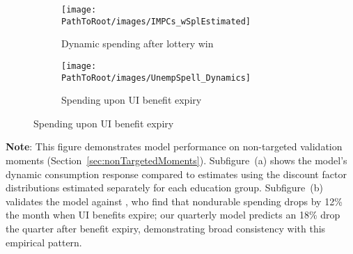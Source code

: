 \documentclass[\PathToRoot/\ProjectName]{subfiles}
\begin{document}
\begin{figure}[H]
  \centering
  \caption{Model validation for non-targeted spending patterns}
  \whenintegrated{\label{fig:untargetedMoments}} 
  \noindent\begin{minipage}{\textwidth}
    \centering
    \begin{subfigure}[b]{.48\linewidth}
      \centering
      \texttt{[image: \\PathToRoot/images/IMPCs\_wSplEstimated]}
      \caption{Dynamic spending after lottery win}
      \whenintegrated{\label{fig:USaggmpclotterywin}} 
    \end{subfigure}
    \begin{subfigure}[b]{.48\linewidth}
      \centering
      \texttt{[image: \\PathToRoot/images/UnempSpell\_Dynamics]}
      \caption{Spending upon UI benefit expiry}
      \whenintegrated{\label{fig:expiryUI}} 
    \end{subfigure}
  \end{minipage}
\end{figure}
\noindent\parbox{\textwidth}{\footnotesize
  \textbf{Note}: This figure demonstrates model performance on non-targeted validation moments (Section~\ref{sec:nonTargetedMoments}).
  Subfigure~(a) shows the model's dynamic consumption response compared to \cite{fagereng-mpc-2021} estimates
  using the discount factor distributions estimated separately for each education group.
  Subfigure~(b) validates the model against \cite{ganongConsumer2019}, who find that nondurable spending
  drops by 12\% the month when UI benefits expire; our quarterly model predicts an 18\% drop
  the quarter after benefit expiry,   demonstrating broad consistency with this empirical pattern.
}

\vspace{1em}  %

\smartbib
\end{document}
